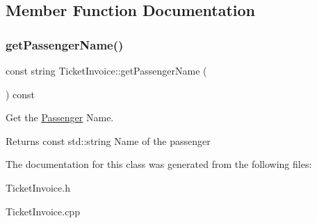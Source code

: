 \subsection{Member Function Documentation}
\mbox{\label{classTicketInvoice_a9fdfdcd08ff90480ca85e027f57033e4}} 
\subsubsection{\texorpdfstring{get\+Passenger\+Name()}{getPassengerName()}}
{\footnotesize\ttfamily const string Ticket\+Invoice\+::get\+Passenger\+Name (\begin{DoxyParamCaption}{ }\end{DoxyParamCaption}) const}



Get the \mbox{\hyperlink{classPassenger}{Passenger}} Name. 

\begin{DoxyReturn}{Returns}
const std\+::string Name of the passenger 
\end{DoxyReturn}


The documentation for this class was generated from the following files\+:\begin{DoxyCompactItemize}
\item 
Ticket\+Invoice.\+h\item 
Ticket\+Invoice.\+cpp\end{DoxyCompactItemize}
